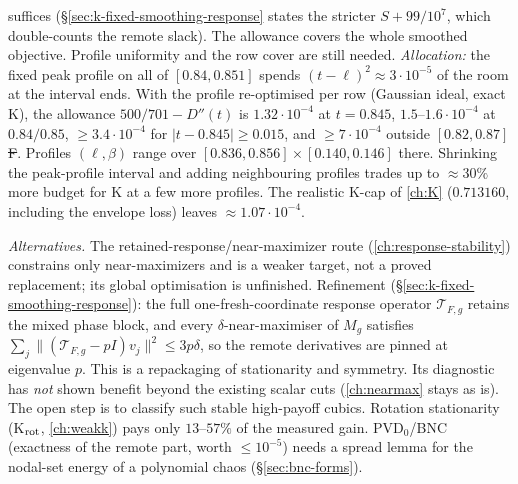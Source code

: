 suffices (\S\ref{sec:k-fixed-smoothing-response} states the stricter $S+99/10^7$, which double-counts the remote slack). The allowance covers the whole smoothed objective. Profile
uniformity and the row cover are still needed. \emph{Allocation:} the fixed peak profile on all of $[0.84,0.851]$ spends $(t-\ell)^2\approx3\cdot10^{-5}$ of the room at the interval
ends. With the profile re-optimised per row (Gaussian ideal, exact K), the allowance $500/701-D''(t)$ is $1.32\cdot10^{-4}$ at $t=0.845$, $1.5$--$1.6\cdot10^{-4}$ at $0.84/0.85$,
$\ge3.4\cdot10^{-4}$ for $|t-0.845|\ge0.015$, and $\ge7\cdot10^{-4}$ outside $[0.82,0.87]$ \st{F}. Profiles $(\ell,\beta)$ range over $[0.836,0.856]\times[0.140,0.146]$ there. Shrinking the
peak-profile interval and adding neighbouring profiles trades up to $\approx30\%$ more budget for K at a few more profiles. The realistic K-cap of \autoref{ch:K} ($0.713160$,
including the envelope loss) leaves $\approx1.07\cdot10^{-4}$.

\emph{Alternatives.} The retained-response/near-maximizer route (\autoref{ch:response-stability}) constrains only near-maximizers and is a weaker target, not a proved
replacement; its global optimisation is unfinished. Refinement (\S\ref{sec:k-fixed-smoothing-response}): the full one-fresh-coordinate response operator $\mathcal T_{F,g}$ retains the mixed
phase block, and every $\delta$-near-maximiser of $M_g$ satisfies $\sum_j\|(\mathcal T_{F,g}-pI)v_j\|^2\le3p\delta$, so the remote derivatives are pinned at eigenvalue $p$.
This is a repackaging of stationarity and symmetry. Its diagnostic has \emph{not} shown benefit beyond the existing scalar cuts (\autoref{ch:nearmax}
stays as is). The open step is to classify such stable high-payoff cubics. Rotation stationarity (K$_{\rm rot}$, \autoref{ch:weakk}) pays only $13$--$57\%$ of the measured gain.
PVD$_0$/BNC (exactness of the remote part, worth $\le10^{-5}$) needs a spread lemma for the nodal-set energy of a polynomial chaos (\S\ref{sec:bnc-forms}).

